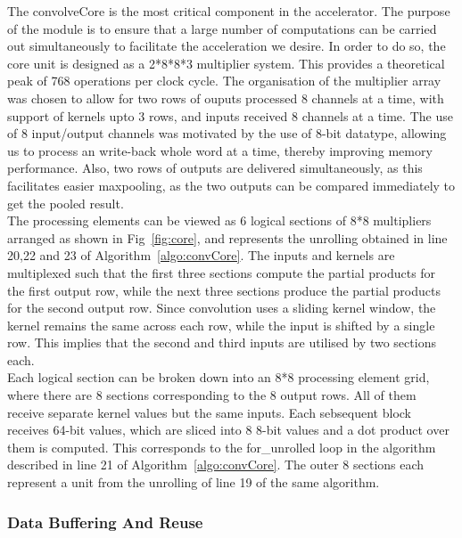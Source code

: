 \documentclass[a4paper,12pt, final]{report}
\begin{document}
The convolveCore is the most critical component in the accelerator. The purpose of the module is to ensure that a large number of computations can be carried out simultaneously to facilitate the acceleration we desire. In order to do so, the core unit is designed as a 2*8*8*3 multiplier system. This provides a theoretical peak of 768 operations per clock cycle. The organisation of the multiplier array was chosen to allow for two rows of ouputs processed 8 channels at a time, with support of kernels upto 3 rows, and inputs received 8 channels at a time. The use of 8 input/output channels was motivated by the use of 8-bit datatype, allowing us to process an write-back whole word at a time, thereby improving memory performance. Also, two rows of outputs are delivered simultaneously, as this facilitates easier maxpooling, as the two outputs can be compared immediately to get the pooled result.
\\

The processing elements can be viewed as 6 logical sections of 8*8 multipliers arranged as shown in Fig~\ref{fig:core}, and represents the unrolling obtained in line 20,22 and 23 of Algorithm~\ref{algo:convCore}. The inputs and kernels are multiplexed such that the first three sections compute the partial products for the first output row, while the next three sections produce the partial products for the second output row. Since convolution uses a sliding kernel window, the kernel remains the same across each row, while the input is shifted by a single row. This implies that the second and third inputs are utilised by two sections each.
\\

Each logical section can be broken down into an 8*8 processing element grid, where there are 8 sections corresponding to the 8 output rows. All of them receive separate kernel values but the same inputs. Each sebsequent block receives 64-bit values, which are sliced into 8 8-bit values and a dot product over them is computed. This corresponds to the for\_unrolled loop in the algorithm described in line 21 of Algorithm~\ref{algo:convCore}. The outer 8 sections each represent a unit from the unrolling of line 19 of the same algorithm.
\\

\subsubsection{Data Buffering And Reuse}
\end{document}
